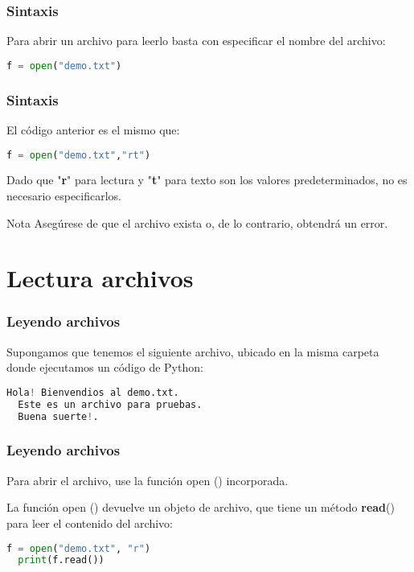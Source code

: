 \begin{frame}[fragile]
  \frametitle{Sintaxis}

  Para abrir un archivo para leerlo basta con especificar
  el nombre del archivo: 

  \vspace{\baselineskip}
  \begin{lstlisting}[language=Python]
  f = open("demo.txt")
  \end{lstlisting}
\end{frame}

\begin{frame}[fragile]
  \frametitle{Sintaxis}

  El código anterior es el mismo que: 

  \vspace{\baselineskip}
  \begin{lstlisting}[language=Python]
  f = open("demo.txt","rt")
  \end{lstlisting}

  \vspace{\baselineskip}
  Dado que "\textbf{r}" para lectura y "\textbf{t}" para texto
  son los valores predeterminados, no es necesario especificarlos.

  \pausa
  \begin{alertblock}{Nota}
  Asegúrese de que el archivo exista o, de lo contrario, obtendrá un error.
  \end{alertblock}
\end{frame}

\section{Lectura archivos}

\begin{frame}[fragile]
  \frametitle{Leyendo archivos}

  Supongamos que tenemos el siguiente archivo, ubicado en la
  misma carpeta donde ejecutamos un código de Python:

  \vspace{\baselineskip}
  \begin{lstlisting}[language=Python]
  Hola! Bienvendios al demo.txt.
  Este es un archivo para pruebas.
  Buena suerte!.
  \end{lstlisting}
\end{frame}

\begin{frame}[fragile]
  \frametitle{Leyendo archivos}

  Para abrir el archivo, use la función open () incorporada.

  \vspace{\baselineskip}
  La función open () devuelve un objeto de archivo, que tiene un
  método \textbf{read}() para leer el contenido del archivo: 

  \vspace{\baselineskip}
  \begin{lstlisting}[language=Python]
  f = open("demo.txt", "r")
  print(f.read())
  \end{lstlisting}
\end{frame}

